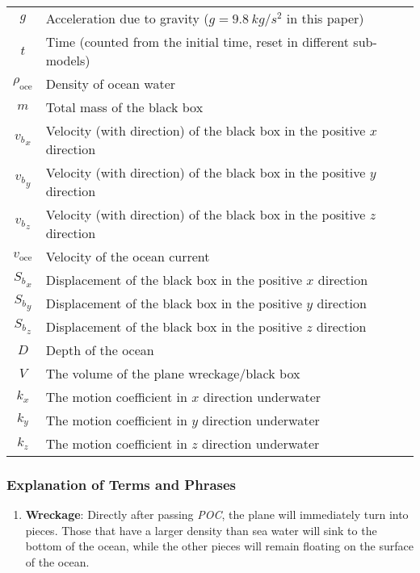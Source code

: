 \documentclass[a4paper,11pt]{article}
\begin{document}
\begin{spacing}{1.0}
\begin{center}
\begin{longtable}{cl}
		$g$ & Acceleration due to gravity ($g = 9.8 ~\unit{kg/s^2}$ in this paper) \\
		$t$ & Time (counted from the initial time, reset in different sub-models) \\
		$\rho_\text{oce}$ & Density of ocean water \\
		$m$ & Total mass of the black box \\
		${v_b}_{x}$ & Velocity (with direction) of the black box in the positive $x$ direction \\
		${v_b}_{y}$ & Velocity (with direction) of the black box in the positive $y$ direction \\
		${v_b}_{z}$ & Velocity (with direction) of the black box in the positive $z$ direction \\
		$v_\text{oce}$ & Velocity of the ocean current \\
		${S_b}_{x}$ & Displacement of the black box in the positive $x$ direction \\
		${S_b}_{y}$ & Displacement of the black box in the positive $y$ direction \\
		${S_b}_{z}$ & Displacement of the black box in the positive $z$ direction \\
		$D$ & Depth of the ocean \\
		$V$ & The volume of the plane wreckage/black box \\
		$k_x$ & The motion coefficient in $x$ direction underwater \\
		$k_y$ & The motion coefficient in $y$ direction underwater \\
		$k_z$ & The motion coefficient in $z$ direction underwater \\
		
	\end{longtable}  	
\end{center}

\subsubsection{Explanation of Terms and Phrases}\label{Terms def ii}
\begin{enumerate}
	\item \textbf{Wreckage}: Directly after passing \textit{POC}, the plane will immediately turn into pieces. Those that have a larger density than sea water will sink to the bottom of the ocean, while the other pieces will remain floating on the surface of the ocean. 
	

\end{enumerate}
\end{spacing}
\end{document}
